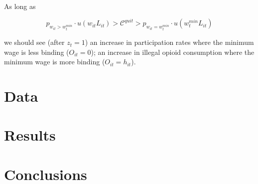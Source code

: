 \documentclass[12pt,a4paper]{article}
\begin{document}
As long as

\[
    p_{w_{it} > w^{min}_t}\cdot u(w_{it}L_{it}) > \mathcal{C}^{quit} > p_{w_{it} = w^{min}_t}\cdot u(w^{min}_t L_{it})
\]

we should see (after \(z_{t} = 1\)) an increase in participation rates where the minimum wage is less binding (\(O_{it} = 0\)); an increase in illegal opioid consumption where the minimum wage is more binding (\(O_{it} = h_{it}\)).

\section*{Data}

\section*{Results}

\section*{Conclusions}

\printbibliography
\end{document}
